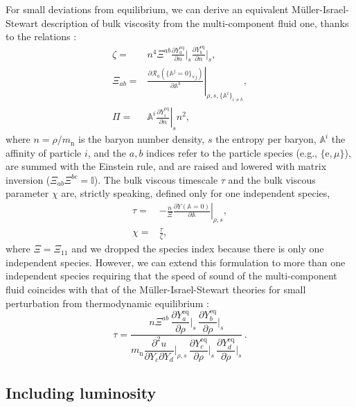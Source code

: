 \documentclass[aps,prd,twocolumn,a4paper,floatfix,nofootbib,superscriptaddress,nofootinbib]{revtex4}
\newcommand{\re}{\mathrm{e}}
\newcommand{\rn}{\mathrm{n}}
\newcommand{\req}{\mathrm{eq}}
\begin{document}
For small deviations from equilibrium, we can derive an equivalent
M\"uller-Israel-Stewart description of bulk viscosity from the multi-component fluid one,
thanks to the relations \cite{Gavassino21bulk, GavassinoRadiazio2020, Camelio22a}:
%
\begin{align}
\label{eq:def-zeta}
\zeta={}&n^4\Xi^{ab}\frac{\partial Y_a^\req}{\partial n}\bigg|_s\frac{\partial Y_b^\req}{\partial n}\bigg|_s,\\
\label{eq:def-xi}
\Xi_{ab}={}&\left.\frac{\partial \mathcal R_a(\{\mathbb A^j=0\}_{\forall j})}{\partial \mathbb A^b}\right|_{\rho,s,\{\mathbb A^i\}_{i\neq b}},\\
\label{eq:a2pi}
\Pi={}&\mathbb A^i\left.\frac{\partial Y_i^\req}{\partial n}\right|_{s}n^2,
\end{align}
%
where $n=\rho/m_\rn$ is the baryon number density, $s$ the entropy per baryon, 
$\mathbb A^i$ the affinity of particle $i$, and the $a,b$ indices refer
to the particle species (e.g., $\{\re,\mu\}$), are summed with the Einstein
rule, and are raised and lowered with matrix inversion
($\Xi_{ab}\Xi^{bc}=\mathbb I$).  The bulk viscous timescale $\tau$ and the bulk
viscous parameter $\chi$ are, strictly speaking, defined only for one
independent species,
%
\begin{align}
\label{eq:tau-from-tracking}
\tau={}&-\frac{n}{\Xi}\left.\frac{\partial Y(\mathbb A=0)}{\partial \mathbb A}\right|_{\rho,s},\\
\chi={}&\frac\tau\zeta,
\end{align}
%
where $\Xi=\Xi_{11}$ and we dropped the species index because there is only one independent
species. However, we can extend this formulation to more than one independent species
requiring that the speed of sound of the multi-component 
fluid coincides with that of the M\"uller-Israel-Stewart theories for small perturbation from thermodynamic equilibrium \cite{Camelio22a}:
%
\begin{equation}
\label{eq:tau-multispecies}
\tau = \dfrac{n \Xi^{ab} \,  \dfrac{\partial Y_a^\req}{\partial \rho} \bigg|_s
\,  \dfrac{\partial Y_b^\req}{\partial \rho} \bigg|_s}{ m_\rn \dfrac{\partial^2
u}{\partial Y_c \partial Y_d} \bigg|_{\rho,s} \,  \dfrac{\partial
Y_c^\req}{\partial \rho} \bigg|_s \, \dfrac{\partial Y_d^\req}{\partial \rho}
\bigg|_s} \, .
\end{equation}

\subsection{Including luminosity}
\end{document}
